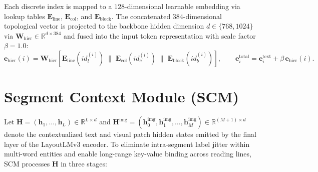 Each discrete index is mapped to a $128$-dimensional learnable embedding via lookup tables $\mathbf{E}_{\text{line}}$, $\mathbf{E}_{\text{col}}$, and $\mathbf{E}_{\text{block}}$. The concatenated $384$-dimensional topological vector is projected to the backbone hidden dimension $d \in \{768, 1024\}$ via $\mathbf{W}_{\text{hier}} \in \mathbb{R}^{d \times 384}$ and fused into the input token representation with scale factor $\beta = 1.0$:
\begin{equation}
    \mathbf{e}_{\text{hier}}(i) = \mathbf{W}_{\text{hier}} \left[ \mathbf{E}_{\text{line}}(id_l^{(i)}) \;\|\; \mathbf{E}_{\text{col}}(id_c^{(i)}) \;\|\; \mathbf{E}_{\text{block}}(id_b^{(i)}) \right], \qquad
    \mathbf{e}_i^{\text{total}} = \mathbf{e}_i^{\text{text}} + \beta \, \mathbf{e}_{\text{hier}}(i).
    \label{eq:hpe_embedding}
\end{equation}

\section{Segment Context Module (SCM)}
\label{sec:method_scm}

Let $\mathbf{H} = (\mathbf{h}_1, \dots, \mathbf{h}_L) \in \mathbb{R}^{L \times d}$ and $\mathbf{H}^{\text{img}} = (\mathbf{h}_0^{\text{img}}, \mathbf{h}_1^{\text{img}}, \dots, \mathbf{h}_M^{\text{img}}) \in \mathbb{R}^{(M+1) \times d}$ denote the contextualized text and visual patch hidden states emitted by the final layer of the LayoutLMv3 encoder. To eliminate intra-segment label jitter within multi-word entities and enable long-range key-value binding across reading lines, SCM processes $\mathbf{H}$ in three stages:

